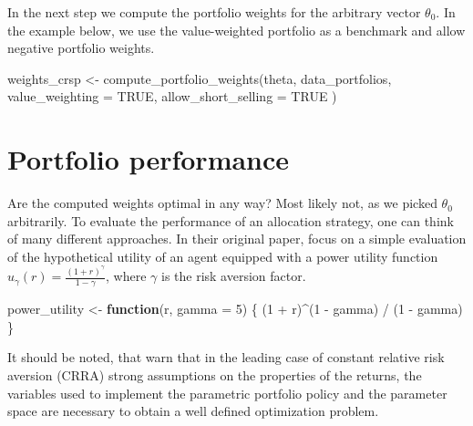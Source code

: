 \documentclass[
]{krantz}
\newenvironment{Shaded}{\begin{snugshade}}{\end{snugshade}}
\newcommand{\AttributeTok}[1]{\textcolor[rgb]{0.61,0.61,0.61}{#1}}
\newcommand{\ConstantTok}[1]{\textcolor[rgb]{0,0,0}{#1}}
\newcommand{\ControlFlowTok}[1]{\textcolor[rgb]{0.27,0.27,0.27}{\textbf{#1}}}
\newcommand{\DecValTok}[1]{\textcolor[rgb]{0.06,0.06,0.06}{#1}}
\newcommand{\FunctionTok}[1]{\textcolor[rgb]{0,0,0}{#1}}
\newcommand{\NormalTok}[1]{#1}
\newcommand{\OtherTok}[1]{\textcolor[rgb]{0.37,0.37,0.37}{#1}}
\newcommand{\SpecialCharTok}[1]{\textcolor[rgb]{0,0,0}{#1}}
\begin{document}
In the next step we compute the portfolio weights for the arbitrary vector \(\theta_0\). In the example below, we use the value-weighted portfolio as a benchmark and allow negative portfolio weights.

\begin{Shaded}
\begin{Highlighting}[]
\NormalTok{weights\_crsp }\OtherTok{\textless{}{-}} \FunctionTok{compute\_portfolio\_weights}\NormalTok{(theta,}
\NormalTok{  data\_portfolios,}
  \AttributeTok{value\_weighting =} \ConstantTok{TRUE}\NormalTok{,}
  \AttributeTok{allow\_short\_selling =} \ConstantTok{TRUE}
\NormalTok{)}
\end{Highlighting}
\end{Shaded}

\hypertarget{portfolio-performance}{%
\section{Portfolio performance}\label{portfolio-performance}}

Are the computed weights optimal in any way? Most likely not, as we picked \(\theta_0\) arbitrarily. To evaluate the performance of an allocation strategy, one can think of many different approaches. In their original paper, \citet{Brandt2009} focus on a simple evaluation of the hypothetical utility of an agent equipped with a power utility function \(u_\gamma(r) = \frac{(1 + r)^\gamma}{1-\gamma}\), where \(\gamma\) is the risk aversion factor.

\begin{Shaded}
\begin{Highlighting}[]
\NormalTok{power\_utility }\OtherTok{\textless{}{-}} \ControlFlowTok{function}\NormalTok{(r, }\AttributeTok{gamma =} \DecValTok{5}\NormalTok{) \{}
\NormalTok{  (}\DecValTok{1} \SpecialCharTok{+}\NormalTok{ r)}\SpecialCharTok{\^{}}\NormalTok{(}\DecValTok{1} \SpecialCharTok{{-}}\NormalTok{ gamma) }\SpecialCharTok{/}\NormalTok{ (}\DecValTok{1} \SpecialCharTok{{-}}\NormalTok{ gamma)}
\NormalTok{\}}
\end{Highlighting}
\end{Shaded}

It should be noted, that \citet{Gehrig2020} warn that in the leading case of constant relative risk aversion (CRRA) strong assumptions on the properties of the returns, the variables used to implement the parametric portfolio policy and the
parameter space are necessary to obtain a well defined optimization problem.
\end{document}
